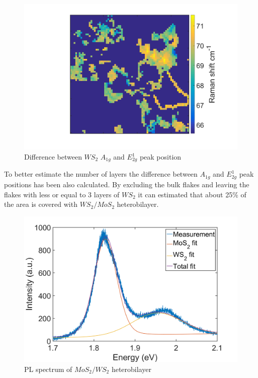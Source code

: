 \begin{figure}[H]
	\begin{center}
		\includegraphics[scale=0.3]{Heterostructures/HeterostructureRamanDifferenceW.png}
		\caption{Difference between $WS_2$ $A_{1g}$ and $E^1_{2g}$ peak position}
		\label{fig:HeterostructuresRamanDifferenceW}
	\end{center}
\end{figure}

To better estimate the number of layers the difference between $A_{1g}$ and $E^1_{2g}$ peak positions has been also calculated. By excluding the bulk flakes and leaving the flakes with less or equal to 3 layers of $WS_2$ it can estimated that about 25\% of the area is covered with $WS_2/MoS_2$ heterobilayer.

\begin{figure}[H]
	\begin{center}
		\includegraphics[scale=0.3]{Heterostructures/HeterostructurePLSpectrumFitted.png}
		\caption{PL spectrum of $MoS_2/WS_2$ heterobilayer}
		\label{fig:HeterostructuresPLSpectrumFitted}
	\end{center}
\end{figure}

